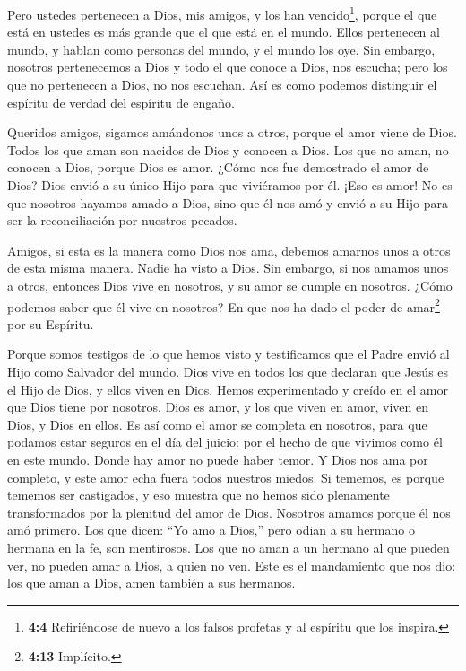  Pero ustedes pertenecen a Dios, mis amigos, y los han
vencido\footnote{\textbf{4:4} Refiriéndose de nuevo a los falsos
  profetas y al espíritu que los inspira.}, porque el que está en
ustedes es más grande que el que está en el mundo.  Ellos
pertenecen al mundo, y hablan como personas del mundo, y el mundo los
oye.  Sin embargo, nosotros pertenecemos a Dios y todo el
que conoce a Dios, nos escucha; pero los que no pertenecen a Dios, no
nos escuchan. Así es como podemos distinguir el espíritu de verdad del
espíritu de engaño.

 Queridos amigos, sigamos amándonos unos a otros, porque el
amor viene de Dios. Todos los que aman son nacidos de Dios y conocen a
Dios.  Los que no aman, no conocen a Dios, porque Dios es
amor.  ¿Cómo nos fue demostrado el amor de Dios? Dios envió
a su único Hijo para que viviéramos por él.  ¡Eso es amor!
No es que nosotros hayamos amado a Dios, sino que él nos amó y envió a
su Hijo para ser la reconciliación por nuestros pecados.

 Amigos, si esta es la manera como Dios nos ama, debemos
amarnos unos a otros de esta misma manera.  Nadie ha visto
a Dios. Sin embargo, si nos amamos unos a otros, entonces Dios vive en
nosotros, y su amor se cumple en nosotros.  ¿Cómo podemos
saber que él vive en nosotros? En que nos ha dado el poder de
amar\footnote{\textbf{4:13} Implícito.} por su Espíritu.

 Porque somos testigos de lo que hemos visto y testificamos
que el Padre envió al Hijo como Salvador del mundo.  Dios
vive en todos los que declaran que Jesús es el Hijo de Dios, y ellos
viven en Dios.  Hemos experimentado y creído en el amor que
Dios tiene por nosotros. Dios es amor, y los que viven en amor, viven en
Dios, y Dios en ellos.  Es así como el amor se completa en
nosotros, para que podamos estar seguros en el día del juicio: por el
hecho de que vivimos como él en este mundo.  Donde hay amor
no puede haber temor. Y Dios nos ama por completo, y este amor echa
fuera todos nuestros miedos. Si tememos, es porque tememos ser
castigados, y eso muestra que no hemos sido plenamente transformados por
la plenitud del amor de Dios.  Nosotros amamos porque él
nos amó primero.  Los que dicen: ``Yo amo a Dios,'' pero
odian a su hermano o hermana en la fe, son mentirosos. Los que no aman a
un hermano al que pueden ver, no pueden amar a Dios, a quien no ven.
 Este es el mandamiento que nos dio: los que aman a Dios,
amen también a sus hermanos.


